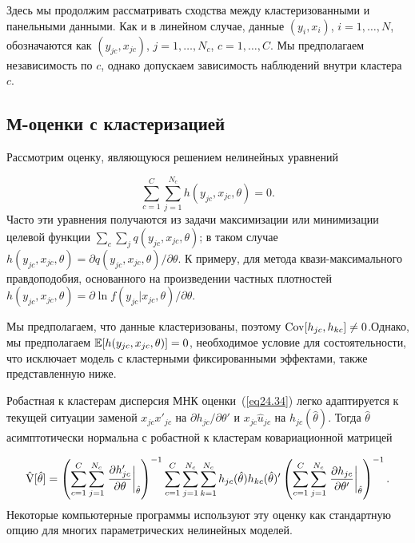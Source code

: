 Здесь мы продолжим рассматривать сходства между кластеризованными и панельными данными. Как и в линейном случае, данные $(y_i, x_i)$, $i = 1, \dots, N$, обозначаются как $(y_{jc}, x_{jc})$, $j = 1, \dots, N_c$, $c = 1, \dots, C$. Мы предполагаем независимость по $c$, однако допускаем зависимость наблюдений внутри кластера $c$. 

\subsection*{М-оценки с кластеризацией}

Рассмотрим оценку, являющуюся решением нелинейных уравнений

\begin{equation}
\label{eq24.44}
\sum_{c=1}^{C} \sum_{j=1}^{N_c} h (y_{jc}, x_{jc}, \theta) = 0.
\end{equation}
Часто эти уравнения получаются из задачи максимизации или минимизации целевой функции $\sum_c \sum_j q(y_{jc}, x_{jc}, \theta)$; в таком случае $  h (y_{jc}, x_{jc}, \theta) = \partial q(y_{jc}, x_{jc}, \theta) / \partial \theta$. К примеру, для метода квази-максимального правдоподобия, основанного на произведении частных плотностей $ h (y_{jc}, x_{jc}, \theta) = \partial \ln{ f (y_{jc}| x_{jc}, \theta)} / \partial \theta$. 

Мы предполагаем, что данные кластеризованы, поэтому $\mathrm{Cov}[h_{jc}, h_{kc}] \ne 0$.Однако, мы предполагаем $\mathbb{E}[ h (y_{jc}, x_{jc}, \theta)] = 0$, необходимое условие для состоятельности, что исключает модель с кластерными фиксированными эффектами, также представленную ниже. 

Робастная к кластерам дисперсия МНК оценки~(\ref{eq24.34}) легко адаптируется к текущей ситуации заменой $x_{jc} x'_{jc}$ на $\partial h_{jc} / \partial \theta'$ и $x_{jc} \hat u_{jc}$ на $h_{jc} (\hat \theta)$. Тогда $\hat \theta$ асимптотически нормальна с робастной к кластерам ковариационной матрицей

\begin{equation}
\label{eq24.45}
\hat {\mathrm{V}}[\hat \theta] = \left( \sum_{c=1}^C \sum_{j=1}^{N_c} \left. \frac{\partial h'_{jc}}{\partial \theta} \right| _{\hat \theta} \right)^{-1} \sum_{c=1}^C \sum_{j=1}^{N_c} \sum_{k=1}^{N_c} h_{jc}(\hat \theta) h_{kc} (\hat \theta)' \left( \sum_{c=1}^C \sum_{j=1}^{N_c} \left. \frac{\partial h_{jc}}{\partial \theta'} \right| _{\hat \theta} \right)^{-1}. 
\end{equation}
Некоторые компьютерные программы используют эту оценку как стандартную опцию для многих параметрических нелинейных моделей. 

